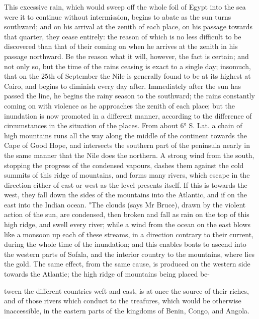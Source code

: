 \documentclass{article}
\begin{document}
This excessive rain, which would sweep off the whole foil of Egypt into the sea were it to continue without intermission, begins to abate as the sun turns southward; and on his arrival at the zenith of each place, on his passage towards that quarter, they cease entirely: the reason of which is no less difficult to be discovered than that of their coming on when he arrives at the zenith in his passage northward. Be the reason what it will, however, the fact is certain; and not only so, but the time of the rains ceasing is exact to a single day; insomuch, that on the 25th of September the Nile is generally found to be at its highest at Cairo, and begins to diminish every day after. Immediately after the sun has passed the line, he begins the rainy season to the southward; the rains constantly coming on with violence as he approaches the zenith of each place; but the inundation is now promoted in a different manner, according to the difference of circumstances in the situation of the places. From about 6° S. Lat. a chain of high mountains runs all the way along the middle of the continent towards the Cape of Good Hope, and intersects the southern part of the peninsula nearly in the same manner that the Nile does the northern. A strong wind from the south, stopping the progress of the condensed vapours, dashes them against the cold summits of this ridge of mountains, and forms many rivers, which escape in the direction either of east or west as the level presents itself. If this is towards the west, they fall down the sides of the mountains into the Atlantic, and if on the east into the Indian ocean. "The clouds (says Mr Bruce), drawn by the violent action of the sun, are condensed, then broken and fall as rain on the top of this high ridge, and swell every river; while a wind from the ocean on the east blows like a monsoon up each of these streams, in a direction contrary to their current, during the whole time of the inundation; and this enables boats to ascend into the western parts of Sofala, and the interior country to the mountains, where lies the gold. The same effect, from the same cause, is produced on the western side towards the Atlantic; the high ridge of mountains being placed be-

tween the different countries weft and east, is at once the source of their riches, and of those rivers which conduct to the treafures, which would be otherwise inaccessible, in the eastern parts of the kingdoms of Benin, Congo, and Angola.
\end{document}
